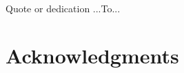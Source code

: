 % 
% 
% 
% 
%








   \frontmatter

   \pagestyle{prelim}
   
   
   \newpage
	
	
	 \thispagestyle{plain}
	 \vspace*{20em}
	 \begin{center}
	   Quote or dedication ...To...
	 \end{center}
	 \newpage
   
   \doublespacing
   
   \tableofcontents
   \newpage
   
   
   \newpage
   
   \section*{Acknowledgments}
   
   
   \mainmatter
   
